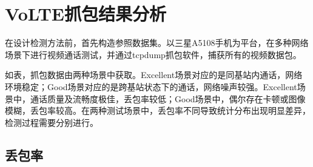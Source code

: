 \section{VoLTE抓包结果分析}
\label{chap:analyze:results}

在设计检测方法前，首先构造参照数据集。以三星A5108手机为平台，在多种网络场景下进行视频通话测试，并通过tcpdump抓包软件，捕获所有的视频数据包。

如表，抓包数据由两种场景中获取。Excellent场景对应的是同基站内通话，网络环境稳定；Good场景对应的是跨基站状态下的通话，网络噪声较强。Excellent场景中，通话质量及流畅度极佳，丢包率较低；Good场景中，偶尔存在卡顿或图像模糊，丢包率较高。在两种测试场景中，丢包率不同导致统计分布出现明显差异，检测过程需要分别进行。

\subsection{丢包率}
\label{chap:analyze:results:plr}

